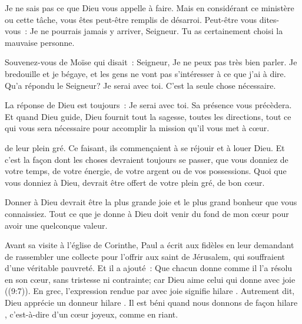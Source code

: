 
Je ne sais pas ce que Dieu vous appelle à faire.
 Mais en considérant ce ministère ou cette tâche,
 vous êtes peut-être remplis de désarroi. Peut-être vous dites-vous~:
 \og Je ne pourrais jamais y arriver, Seigneur.
 Tu as certainement choisi la mauvaise personne. \fg{}

Souvenez-vous de Moïse qui disait~:
 \og Seigneur, Je ne peux pas très bien parler. Je bredouille et je bégaye,
 et les gens ne vont pas s'intéresser à ce que j'ai à dire. \fg{}
 Qu'a répondu le Seigneur? \og Je serai avec toi. \fg{}
 C'est la seule chose nécessaire.

La réponse de Dieu est toujours~: \og Je serai avec toi. \fg{}
 Sa présence vous précèdera.
 Et quand Dieu guide, Dieu fournit tout la sagesse, toutes les directions,
 tout ce qui vous sera nécessaire pour accomplir
 la mission qu'il vous met à c\oe{}ur.

\dvrule






 de leur plein gré.
 Ce faisant, ils commençaient à se réjouir et à louer Dieu.
 Et c'est la façon dont les choses devraient toujours se passer,
 que vous donniez de votre temps, de votre énergie, de votre argent
 ou de vos possessions.
 Quoi que vous donniez à Dieu, devrait être offert de votre plein gré,
 de bon c\oe{}ur. 

Donner à Dieu devrait être la plus grande joie et le plus grand bonheur
 que vous connaissiez.
 Tout ce que je donne à Dieu doit venir du fond de mon c\oe{}ur
 pour avoir une quelconque valeur. 


Avant sa visite à l'église de Corinthe, Paul a écrit aux fidèles
 en leur demandant de rassembler une collecte pour l'offrir
 aux saint de Jérusalem, qui souffraient d'une véritable pauvreté.
 Et il a ajouté~:
 \og Que chacun donne comme il l'a résolu en son cœur, sans tristesse
 ni contrainte; car Dieu aime celui qui donne avec joie \fg{}
 ((9:7)).
 En grec, l'expression rendue par \og avec joie \fg{} signifie
 \og hilare \fg{}. Autrement dit, Dieu apprécie un \og donneur hilare \fg{}.
 Il est béni quand nous donnons de façon \og hilare \fg{},
 c'est-à-dire d'un c\oe{}ur joyeux, comme en riant. 

